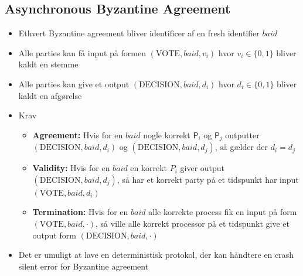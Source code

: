 \documentclass[a4, english]{article}
\begin{document}
\subsection{Asynchronous Byzantine Agreement}
\begin{itemize}
  \item Ethvert Byzantine agreement bliver identificer af en fresh identifier $baid$   
  \item Alle parties kan få input på formen $(\text{VOTE}, baid, v_i)$ hvor $v_i \in \{0,1\}$ bliver kaldt en stemme
  \item Alle parties kan give et output $(\text{DECISION}, baid,d_i)$ hvor $d_i \in \{0,1\}$ bliver kaldt en afgørelse
  \item Krav
  \begin{itemize}
	  \item \textbf{Agreement:} Hvis for en $baid$ nogle korrekt $\mathsf P_i$ og $\mathsf P_j$ outputter $(\text{DECISION}, baid,d_i)$ og $(\text{DECISION}, baid,d_j)$, så gælder der $d_i = d_j$ 
    \item \textbf{Validity:} Hvis for en $baid$ en korrekt $P_i$ giver output $(\text{DECISION}, baid,d_j)$, så har et korrekt party på et tidspunkt har input $(\text{VOTE}, baid, d_i)$
    \item \textbf{Termination:} Hvis for en $baid$ alle korrekte process fik en input på form  $(\text{VOTE}, baid, \cdot)$, så ville alle korrekt processor på et tidspunkt give et output form $(\text{DECISION}, baid, \cdot)$ 
  \end{itemize}
  \item Det er umuligt at lave en deterministisk protokol, der kan håndtere en crash silent error for Byzantine agreement 
\end{itemize}
\end{document}
